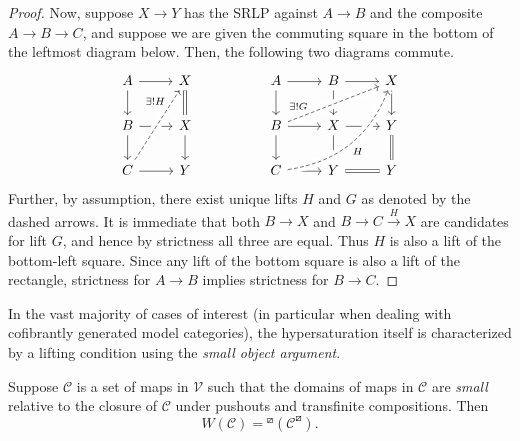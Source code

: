 \documentclass[a4paper,10pt,draft]{article}%
\begin{document}
\begin{proof}
      Now, suppose $X \to Y$ has the SRLP against $A \to B$ and the composite $A \to B \to C$,
      and suppose we are given the commuting square in the bottom of the leftmost diagram below.
      Then, the following two diagrams commute.
      \begin{equation}
            \begin{tikzcd}                  
                  A \arrow[r] \arrow[d]
                  &
                  X \arrow[d, equal]
                  &&
                  A \arrow[r] \arrow[d]
                  &
                  B \arrow[d] \arrow[r]
                  &
                  X \arrow[d]
                  \\
                  B \arrow[r] \arrow[d]
                  &
                  X \arrow[d]
                  &&
                  B \arrow[r] \arrow[d] \arrow[urr, crossing over, near start, dashed, "\exists ! G"]
                  &
                  X \arrow[r] \arrow[d]
                  &
                  Y \arrow[d, equal]
                  \\
                  C \arrow[r] \arrow[uur, dashed, crossing over, near end, "\exists ! H"]
                  &
                  Y
                  &&
                  C \arrow[r] \arrow[uurr, bend right, crossing over, dashed, "H"']
                  &
                  Y \arrow[r, equal]
                  &
                  Y
            \end{tikzcd}
      \end{equation}
      Further, by assumption, there exist unique lifts $H$ and $G$ as denoted by the dashed arrows.
      It is immediate that both $B \to X$ and $B \to C \xrightarrow{H} X$ are candidates for lift $G$,
      and hence by strictness all three are equal.
      Thus $H$ is also a lift of the bottom-left square.
      Since any lift of the bottom square is also a lift of the rectangle,
      strictness for $A \to B$ implies strictness for $B \to C$.
\end{proof}


In the vast majority of cases of interest
(in particular when dealing with cofibrantly generated model categories),
the hypersaturation itself is characterized by a lifting condition using the \textit{small object argument}.

\begin{lemma}
      Suppose $\mathcal C$ is a set of maps in $\mathcal V$ such that
      the domains of maps in $\mathcal C$ are \textit{small} relative to
      the closure of $\mathcal C$ under pushouts and transfinite compositions.
      Then
      \begin{equation}
            W(\mathcal C) = {}^\boxslash(\mathcal C^{\boxslash}).
      \end{equation}
\end{lemma}
\end{document}
